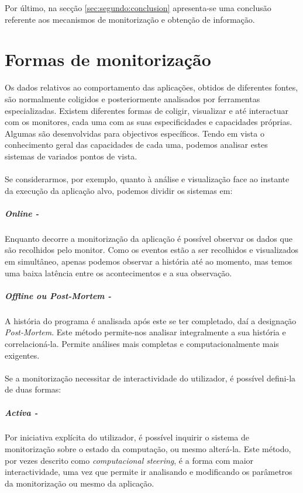 Por último, na secção \ref{sec:segundo:conclusion} apresenta-se uma conclusão referente aos mecanismos de monitorização e obtenção de informação.

\section{Formas de monitorização}\label{sect:instrumentation_overview}

Os dados relativos ao comportamento das aplicações, obtidos de diferentes fontes, são normalmente coligidos e posteriormente analisados por ferramentas especializadas.
Existem diferentes formas de coligir, visualizar e até interactuar com os monitores, cada uma com as suas especificidades e capacidades próprias.
Algumas são desenvolvidas para objectivos específicos.
Tendo em vista o conhecimento geral das capacidades de cada uma, podemos analisar estes sistemas de variados pontos de vista.

\paragraph*{}
Se considerarmos, por exemplo, quanto à análise e visualização face ao instante da execução da aplicação alvo, podemos dividir os sistemas em:
 
\subparagraph*{Online -}
Enquanto decorre a monitorização da aplicação é possível observar os dados que são recolhidos pelo monitor.
Como os eventos estão a ser recolhidos e visualizados em simultâneo, apenas podemos observar a história até ao momento, mas temos uma baixa latência entre os acontecimentos e a sua observação.

\subparagraph*{Offline ou \textit{Post-Mortem} - }

A história do programa é analisada após este se ter completado, daí a designação \textit{Post-Mortem}.
Este método permite-nos analisar integralmente a sua história e correlacioná-la.
Permite análises mais completas e computacionalmente mais exigentes.

\paragraph*{}

Se a monitorização necessitar de interactividade do utilizador, é possível defini-la de duas formas:

\subparagraph*{Activa - }

Por iniciativa explícita do utilizador, é possível inquirir o sistema de monitorização sobre o estado da computação, ou mesmo alterá-la.
Este método, por vezes descrito como \textit{computacional steering}, é a forma com maior interactividade, uma vez que permite ir analisando e modificando os parâmetros da monitorização ou mesmo da aplicação.

